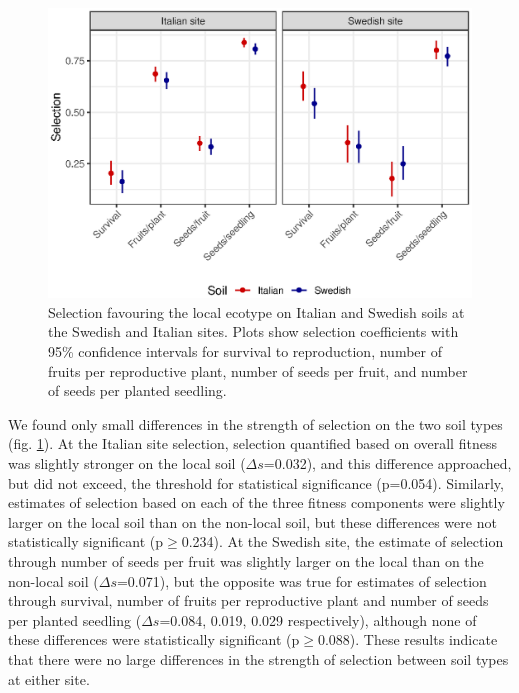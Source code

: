 \documentclass[twocolumn,twoside,lettersize]{article}
\begin{document}
\begin{figure}[]
  \begin{center}
      \includegraphics[]{03_manuscript/figure2.eps}
      \caption{
        Selection favouring the local ecotype on Italian  and Swedish soils at the Swedish and Italian sites. Plots show selection coefficients with 95\% confidence intervals for survival to reproduction, number of fruits per reproductive plant, number of seeds per fruit, and number of seeds per planted seedling.
      }
      \label{fig:02_selection}
  \end{center}
\end{figure}

We found only small differences in the strength of selection on the two soil types (fig. \ref{fig:02_selection}). At the Italian site selection, selection quantified based on overall fitness was slightly stronger on the local soil ($Δs$=0.032), and this difference approached, but did not exceed, the threshold for statistical significance (p=0.054). Similarly, estimates of selection based on each of the three fitness components were slightly larger on the local soil than on the non-local soil, but these differences were not statistically significant (p$≥$0.234). At the Swedish site, the estimate of selection through number of seeds per fruit was slightly larger on the local than on the non-local soil ($Δs$=0.071), but the opposite was true for estimates of selection through survival, number of fruits per reproductive plant and number of seeds per planted seedling ($Δs$=0.084, 0.019, 0.029 respectively), although none of these differences were statistically significant (p$≥$0.088). These results indicate that there were no large differences in the strength of selection between soil types at either site.
\end{document}
